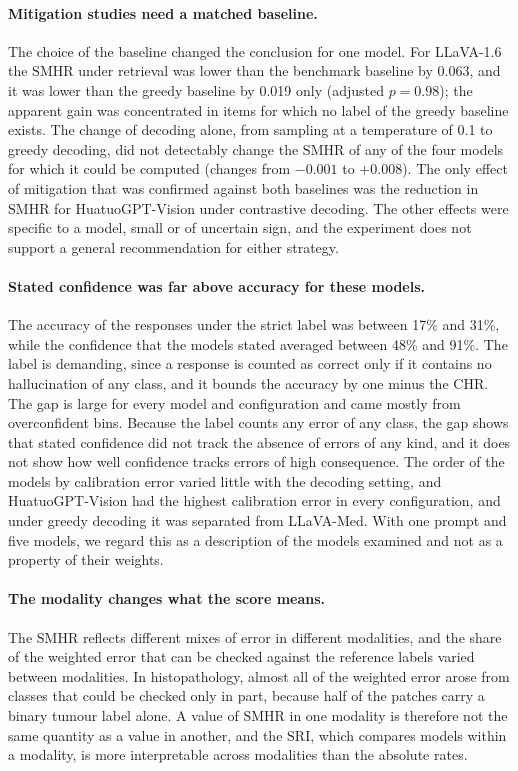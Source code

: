 \documentclass[11pt,a4paper]{article}
\newcommand{\SMHR}{\ensuremath{\mathrm{SMHR}}}
\newcommand{\CHR}{\ensuremath{\mathrm{CHR}}}
\newcommand{\SRI}{\ensuremath{\mathrm{SRI}}}
\begin{document}
\paragraph{Mitigation studies need a matched baseline.} The choice of the baseline changed the conclusion for one model. For LLaVA-1.6 the \SMHR{} under retrieval was lower than the benchmark baseline by 0.063, and it was lower than the greedy baseline by 0.019 only (adjusted $p=0.98$); the apparent gain was concentrated in items for which no label of the greedy baseline exists. The change of decoding alone, from sampling at a temperature of 0.1 to greedy decoding, did not detectably change the \SMHR{} of any of the four models for which it could be computed (changes from $-0.001$ to $+0.008$). The only effect of mitigation that was confirmed against both baselines was the reduction in \SMHR{} for HuatuoGPT-Vision under contrastive decoding. The other effects were specific to a model, small or of uncertain sign, and the experiment does not support a general recommendation for either strategy.

\paragraph{Stated confidence was far above accuracy for these models.} The accuracy of the responses under the strict label was between 17\% and 31\%, while the confidence that the models stated averaged between 48\% and 91\%. The label is demanding, since a response is counted as correct only if it contains no hallucination of any class, and it bounds the accuracy by one minus the \CHR{}. The gap is large for every model and configuration and came mostly from overconfident bins. Because the label counts any error of any class, the gap shows that stated confidence did not track the absence of errors of any kind, and it does not show how well confidence tracks errors of high consequence. The order of the models by calibration error varied little with the decoding setting, and HuatuoGPT-Vision had the highest calibration error in every configuration, and under greedy decoding it was separated from LLaVA-Med. With one prompt and five models, we regard this as a description of the models examined and not as a property of their weights.

\paragraph{The modality changes what the score means.} The \SMHR{} reflects different mixes of error in different modalities, and the share of the weighted error that can be checked against the reference labels varied between modalities. In histopathology, almost all of the weighted error arose from classes that could be checked only in part, because half of the patches carry a binary tumour label alone. A value of \SMHR{} in one modality is therefore not the same quantity as a value in another, and the \SRI{}, which compares models within a modality, is more interpretable across modalities than the absolute rates.
\end{document}
